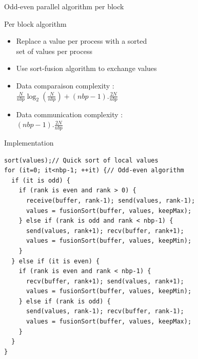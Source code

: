 \documentclass[compress,10pt,aspectratio=169]{beamer}
\begin{document}
\begin{frame}[fragile]{Odd-even parallel algorithm per block}
  \scriptsize
  \begin{multicols}{2}
  \begin{block}{\small Per block algorithm}
    \begin{itemize}
    \item Replace a value per process with a sorted \\
          set of values per process
    \item Use sort-fusion algorithm to exchange values
    \item Data comparaison complexity : \\
      $
      \frac{N}{nbp}\log_{2}\left(\frac{N}{nbp}\right) +
      (nbp-1).\frac{2N}{nbp}
      $
    \item Data communication complexity : \\
      $
      (nbp-1).\frac{2N}{nbp}
      $
    \end{itemize}
  \end{block}

  \begin{exampleblock}{\small Implementation}
    \begin{verbatim}
sort(values);// Quick sort of local values
for (it=0; it<nbp-1; ++it) {// Odd-even algorithm
  if (it is odd) {
    if (rank is even and rank > 0) {
      receive(buffer, rank-1); send(values, rank-1);
      values = fusionSort(buffer, values, keepMax);
    } else if (rank is odd and rank < nbp-1) {
      send(values, rank+1); recv(buffer, rank+1);
      values = fusionSort(buffer, values, keepMin);
    }
  } else if (it is even) {
    if (rank is even and rank < nbp-1) {
      recv(buffer, rank+1); send(values, rank+1);
      values = fusionSort(buffer, values, keepMin);
    } else if (rank is odd) {
      send(values, rank-1); recv(buffer, rank-1);
      values = fusionSort(buffer, values, keepMax);
    }
  }
}
    \end{verbatim}
  \end{exampleblock}
  \end{multicols}
\end{frame}
\end{document}

